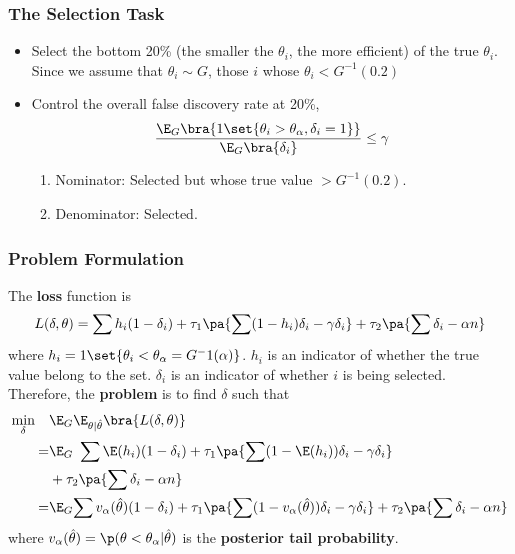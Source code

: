 \documentclass[10pt,mathserif,aspectratio=169]{beamer}
\begin{document}
\begin{frame}
  \frametitle{The Selection Task}
  \begin{itemize}\itemsep=12pt
    \item Select the bottom 20\% (the smaller the $\theta_i$, the more efficient) of the
          true $\theta_i$. Since we assume that $\theta_i \sim G$, those $i$ whose
          $\theta_i<G^{-1}(0.2)$
    \item Control the overall false discovery rate at 20\%,
          \begin{equation*}
            \frac{\E_G\bra{1\set{\theta_i>\theta_{\alpha},\delta_i=1}}}{\E_G\bra{\delta_i}} \le \gamma
          \end{equation*}
          \begin{enumerate}
            \item Nominator: Selected but whose true value $>G^{-1}(0.2)$.
            \item Denominator: Selected.
          \end{enumerate}
  \end{itemize}
\end{frame}

\begin{frame}
  \frametitle{Problem Formulation}
  The \textbf{loss} function is
  \begin{equation*}
    L(\delta,\theta)=\sum h_i(1-\delta_i) +\tau_1\pa{\sum (1-h_i)\delta_i -\gamma \delta_i} + \tau_2 \pa{\sum \delta_i -\alpha n}
  \end{equation*} where $h_i=1\set{\theta_i<\theta_{\alpha}=G^-1(\alpha)}$. $h_i$ is an indicator of whether the true value belong to the set. $\delta_i$ is an indicator of whether $i$ is being selected.
  Therefore, the \textbf{problem} is to find $\delta$ such that
  \begin{align*}
    \min_{\delta} \quad & \E_G\E_{\theta|\hat{\theta}}\bra{L(\delta,\theta)}                                                                                                       \\
    =                   & \E_G \ \sum \E(h_i)(1-\delta_i) +\tau_1\pa{\sum (1-\E(h_i))\delta_i -\gamma \delta_i}                                                                    \\
                        & + \tau_2 \pa{\sum \delta_i -\alpha n}                                                                                                                    \\
    =                   & \E_G{\sum v_\alpha(\hat{\theta})(1-\delta_i) +\tau_1\pa{\sum (1-v_\alpha(\hat{\theta}))\delta_i -\gamma \delta_i} + \tau_2 \pa{\sum \delta_i -\alpha n}}
  \end{align*}
  where $v_\alpha(\hat{\theta})=\p(\theta<\theta_\alpha|\hat{\theta})$ is the \textbf{posterior tail probability}.
\end{frame}
\end{document}
